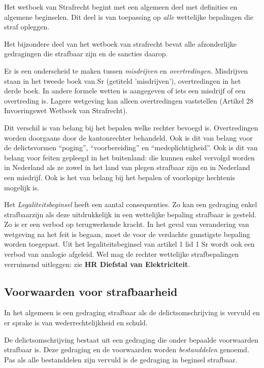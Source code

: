 \documentclass{article}
\begin{document}
Het wetboek van Strafrecht begint met een algemeen deel met definities en
algemene beginselen. Dit deel is van toepassing op \emph{alle} wettelijke
bepalingen die straf opleggen.

Het bijzondere deel van het wetboek van strafrecht bevat alle afzonderlijke
gedragingen die strafbaar zijn en de sancties daarop.

Er is een onderscheid te maken tussen \emph{misdrijven} en
\emph{overtredingen}. Misdrijven staan in het tweede boek van Sr (getiteld
'misdrijven'), overtredingen in het derde boek. In andere formele wetten is
aangegeven of iets een misdrijf of een overtreding is. Lagere wetgeving kan
alleen overtredingen vaststellen (Artikel 28 Invoeringswet Wetboek van
Strafrecht).

Dit verschil is van belang bij het bepalen welke rechter bevoegd is.
Overtredingen worden doorgaans door de kantonrechter behandeld. Ook is dit van
belang voor de delictsvormen ``poging'', ``voorbereiding'' en
``medeplichtigheid''. Ook is dit van belang voor feiten gepleegd in het
buitenland: die kunnen enkel vervolgd worden in Nederland als ze zowel in het
land van plegen strafbaar zijn en in Nederland een misdrijf. Ook is het van
belang bij het bepalen of voorlopige hechtenis mogelijk is.

Het \emph{Legaliteitsbeginsel} heeft een aantal consequenties. Zo kan een
gedraging enkel strafbaarzijn als deze uitdrukkelijk in een wettelijke bepaling
strafbaar is gesteld. Zo is er een verbod op terugwerkende kracht. In het geval
van verandering van wetgeving na het feit is begaan, moet de voor de verdachte
gunstigste bepaling worden toegepast. Uit het legaliteitsbeginsel van artikel
1 lid 1 Sr wordt ook een verbod van analogie afgeleid. Wel mag de rechter
wettelijke strafbepalingen verruimend uitleggen: zie \textbf{HR Diefstal van
Elektriciteit}.


\subsection{Voorwaarden voor strafbaarheid}

In het algemeen is een gedraging strafbaar als de delictsomschrijving is
vervuld en er sprake is van wederrechtelijkheid en schuld.

De delictsomschrijving bestaat uit een gedraging die onder bepaalde voorwaarden
strafbaar is. Deze gedraging en de voorwaarden worden \emph{bestanddelen} genoemd.
Pas als alle bestanddelen zijn vervuld is de gedraging in beginsel strafbaar.
\end{document}
